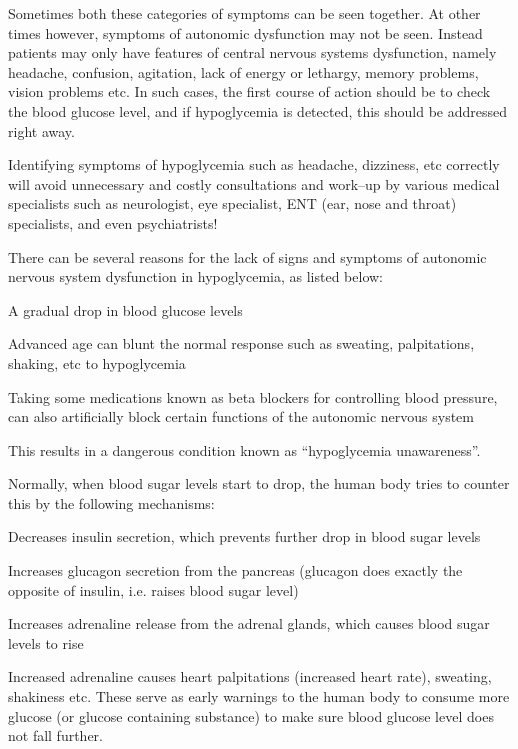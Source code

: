 Sometimes both these categories of symptoms can be seen together. At other times however, symptoms of autonomic dysfunction may not be seen. Instead patients may only have features of central nervous systems dysfunction, namely headache, confusion, agitation, lack of energy or lethargy, memory problems, vision problems etc. In such cases, the first course of action should be to check the blood glucose level, and if hypoglycemia is detected, this should be addressed right away.

Identifying symptoms of hypoglycemia such as headache, dizziness, etc correctly will avoid unnecessary and costly consultations and work–up by various medical specialists such as neurologist, eye specialist, ENT (ear, nose and throat) specialists, and even psychiatrists!

There can be several reasons for the lack of signs and symptoms of autonomic nervous system dysfunction in hypoglycemia, as listed below:

\item A gradual drop in blood glucose levels

 \item Advanced age can blunt the normal response such as sweating, palpitations, shaking, etc to hypoglycemia

 \item Taking some medications known as beta blockers for controlling blood pressure, can also artificially block certain functions of the autonomic nervous system

This results in a dangerous condition known as “hypoglycemia unawareness”.


Normally, when blood sugar levels start to drop, the human body tries to counter this by the following mechanisms:

\item Decreases insulin secretion, which prevents further drop in blood sugar levels

 \item Increases glucagon secretion from the pancreas (glucagon does exactly the opposite of insulin, i.e. raises blood sugar level)

 \item Increases adrenaline release from the adrenal glands, which causes blood sugar levels to rise

 \item Increased adrenaline causes heart palpitations (increased heart rate), sweating, shakiness etc. These serve as early warnings to the human body to consume more glucose (or glucose containing substance) to make sure blood glucose level does not fall further.

